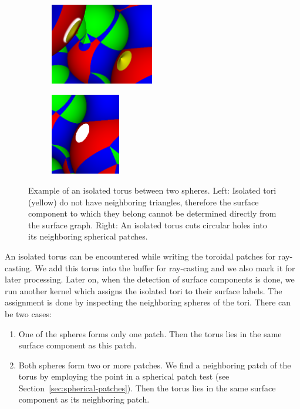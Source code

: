 \begin{figure}[htp]
  \centering
  \begin{subfigure}[t]{0.55\columnwidth}
    \centering
    \includegraphics[height=1.4in]{image/isolated-cutaway2.png}
  \end{subfigure}%
  \quad
  \begin{subfigure}[t]{0.4\columnwidth}
    \centering
    \includegraphics[height=1.4in]{image/isolated-hole.png}
  \end{subfigure}
\caption{Example of an isolated torus between two spheres.
	Left: Isolated tori (yellow) do not have neighboring triangles, therefore the surface component to which they belong cannot be determined directly from the surface graph. Right: An isolated torus cuts circular holes into its neighboring spherical patches.}
\label{fig:isolated-hole}
\end{figure}

An isolated torus can be encountered while writing the toroidal patches for ray-casting.
We add this torus into the buffer for ray-casting and we also mark it for later processing.
Later on, when the detection of surface components is done, we run another kernel which assigns the isolated tori to their surface labels.
The assignment is done by inspecting the neighboring spheres of the tori.
There can be two cases:
\begin{enumerate}
  \item One of the spheres forms only one patch. Then the torus lies in the same surface component as this patch.
	\item Both spheres form two or more patches. We find a neighboring patch of the torus by employing the point in a spherical patch test (see Section~\ref{sec:spherical-patches}). Then the torus lies in the same surface component as its neighboring patch.
\end{enumerate}

